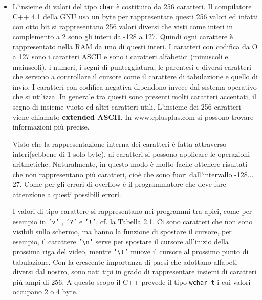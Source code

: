 \begin{itemize}
\item 
L'insieme di valori del tipo \texttt{char} è costituito da 256 caratteri.
Il compilatore C++ 4.1 della GNU usa un byte per rappresentare questi 256 valori ed infatti con otto bit si rappresentano 256 valori diversi che visti come interi in complemento a 2 sono gli interi da -128 a 127.
Quindi ogni carattere è rappresentato nella RAM da uno di questi interi.
I caratteri con codifica da O a 127 sono i caratteri ASCII e sono i caratteri alfabetici (minuscoli e maiuscoli), i numeri, i segni di punteggiatura, le parentesi e diversi caratteri che servono a controllare il cursore come il carattere di tabulazione e quello di invio.
I caratteri con codifica negativa dipendono invece dal sistema operativo che si utilizza.
In generale tra questi sono presenti molti caratteri accentati, il segno di insieme vuoto ed altri caratteri utili.
L'insieme dei 256 caratteri viene chiamato \textbf{extended ASCII}.
In www.cplusplus.com si possono trovare informazioni più precise. 

Visto che la rappresentazione interna dei caratteri è fatta attraverso interi(sebbene di 1 solo byte), ai caratteri si possono applicare le operazioni aritmetiche.
Naturalmente, in questo modo è molto facile ottenere risultati che non rappresentano più caratteri, cioè che sono fuori dall'intervallo -128... 27.
Come per gli errori di overflow è il programmatore che deve fare attenzione a questi possibili errori.

I valori di tipo carattere si rappresentano nei programmi tra apici, come per esempio in \texttt{'v'} , \texttt{'?'} e \texttt{'!'}, cf. la Tabella 2.1.
Ci sono caratteri che non sono visibili sullo schermo, ma hanno la funzione di spostare il cursore, per esempio, il carattere \texttt{'\textbackslash n'} serve per spostare il cursore all'inizio della prossima riga del video, mentre \texttt{'\textbackslash t'} muove il cursore al prossimo punto di tabulazione.
Con la crescente importanza di paesi che adottano alfabeti diversi dal nostro, sono nati tipi in grado di rappresentare insiemi di caratteri più ampi di 256.
A questo scopo il C++ prevede il tipo \texttt{wchar\_t} i cui valori occupano 2 o 4 byte. 


\end{itemize}
